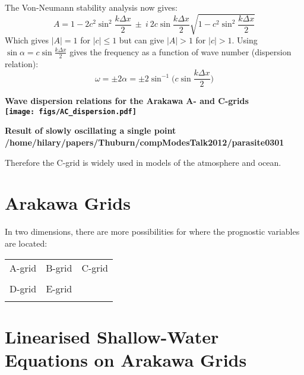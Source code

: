 The Von-Neumann stability analysis now gives:
\begin{equation}
A = 1 - 2c^2\sin^2 \frac{k\Delta x}{2} ~\pm~ i~2c\sin \frac{k\Delta x}{2} \sqrt{1 - c^2 \sin^2 \frac{k\Delta x}{2}}
\end{equation}
Which gives $|A|=1$ for $|c|\le1$ but can give $|A|>1$ for $|c|>1$. Using $\sin\alpha=c\sin\frac{k\Delta x}{2}$ gives the frequency as a function of wave number (dispersion relation):
\begin{equation}
\omega = \pm 2\alpha = \pm 2\sin^{-1}\bigl(c\sin \frac{k\Delta x}{2}\bigr)
\end{equation}

\clearpage
\begin{minipage}{0.49\linewidth}\centering\bf
Wave dispersion relations for the Arakawa A- and C-grids\\
\texttt{[image: figs/AC\_dispersion.pdf]}
\end{minipage}
\hfill
\begin{minipage}{0.49\linewidth}\centering\bf
Result of slowly oscillating a single point\\
{/home/hilary/papers/Thuburn/compModesTalk2012/parasite}{0}{301}
\end{minipage}

Therefore the C-grid is widely used in models of the atmosphere and ocean.

\clearpage
\section{Arakawa Grids}

In two dimensions, there are more possibilities for where the prognostic variables are located:

\begin{tabular}{ccc}
A-grid & B-grid & C-grid \\
&
&
\\
D-grid & E-grid&\\
&
&
\end{tabular}

\section{Linearised Shallow-Water Equations on Arakawa Grids}

